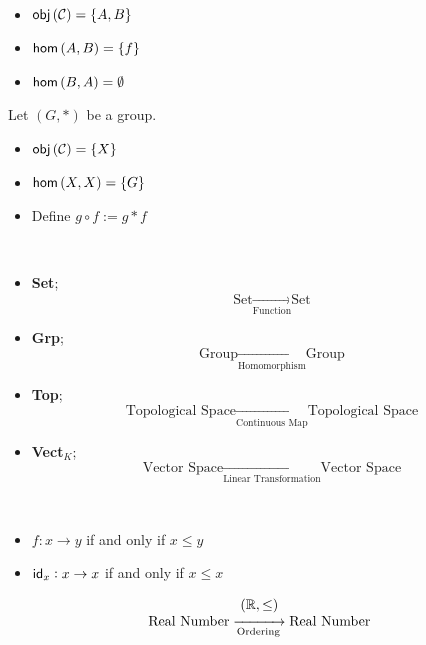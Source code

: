 \documentclass[11pt,openany]{article}
\begin{document}
\begin{example}
	\ \begin{itemize}
		\item $\mathsf{obj}\left(\mathcal{C}\right)=\set{A,B}$
		\item $\mathsf{hom}\left(A,B\right)=\set{f}$
		\item $\mathsf{hom}\left(B,A\right)=\emptyset$
	\end{itemize}
\end{example}

\begin{example}
	Let $(G,*)$ be a group. \begin{itemize}
		\item $\mathsf{obj}\left(\mathcal{C}\right)=\set{X}$
		\item $\mathsf{hom}\left(X,X\right)=\set{G}$
		\item Define $g\circ f:=g*f$
	\end{itemize}
\end{example}

\begin{example}
\ \begin{itemize}
	\item \textbf{Set};\quad $$\text{Set}\xrightarrow[\text{Function}]{}\text{Set}$$
	\item \textbf{Grp};\quad $$\text{Group}\xrightarrow[\text{Homomorphism}]{}\text{Group}$$
	\item \textbf{Top};\quad $$\text{Topological Space}\xrightarrow[\text{Continuous Map}]{}\text{Topological Space}$$
	\item \textbf{Vect}$_K$;\quad $$\text{Vector Space}\xrightarrow[\text{Linear Transformation}]{}\text{Vector Space}$$
\end{itemize}
\end{example}

\newpage
\begin{example}
	\ \begin{itemize}
		\item 
		$f:x\to y$ if and only if $x\leq y$\\
		\item $\mathsf{id}_x:x\to x$ if and only if $x\leq x$
	\end{itemize}
	\[
	\begin{array}{c}
		(\mathbb{R},\leq) \\ \text{Real Number}\xrightarrow[\text{Ordering}]{}\text{Real Number}
	\end{array}
	\]
\end{example}
\end{document}
